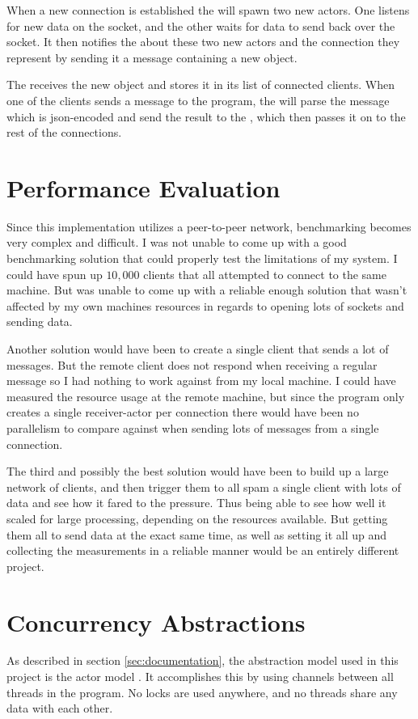 When a new connection is established the  will spawn two new actors. One listens for new data on the socket, and the other waits for data to send back over the socket. It then notifies the  about these two new actors and the connection they represent by sending it a message containing a new  object.

The  receives the new  object and stores it in its list of connected clients. When one of the clients sends a message to the program, the  will parse the message which is json-encoded and send the result to the , which then passes it on to the rest of the connections.

\section{Performance Evaluation}
Since this implementation utilizes a peer-to-peer network, benchmarking becomes very complex and difficult. I was not unable to come up with a good benchmarking solution that could properly test the limitations of my system. I could have spun up $10,000$ clients that all attempted to connect to the same machine. But was unable to come up with a reliable enough solution that wasn't affected by my own machines resources in regards to opening lots of sockets and sending data.

Another solution would have been to create a single client that sends a lot of messages. But the remote client does not respond when receiving a regular message so I had nothing to work against from my local machine. I could have measured the resource usage at the remote machine, but since the program only creates a single receiver-actor per connection there would have been no parallelism to compare against when sending lots of messages from a single connection.

The third and possibly the best solution would have been to build up a large network of clients, and then trigger them to all spam a single client with lots of data and see how it fared to the pressure. Thus being able to see how well it scaled for large processing, depending on the resources available. But getting them all to send data at the exact same time, as well as setting it all up and collecting the measurements in a reliable manner would be an entirely different project.

\section{Concurrency Abstractions}
As described in section \ref{sec:documentation}, the abstraction model used in this project is the actor model \cite{agha1985actors}. It accomplishes this by using channels between all threads in the program. No locks are used anywhere, and no threads share any data with each other.

